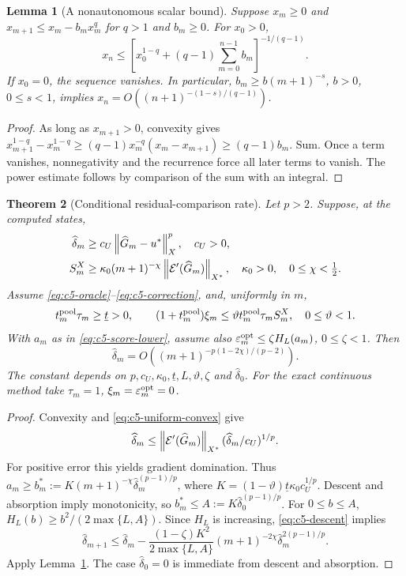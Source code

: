 \documentclass[11pt]{article}
\newtheorem{theorem}{Theorem}[section]
\newtheorem{lemma}[theorem]{Lemma}
\theoremstyle{remark}
\begin{document}
\begin{lemma}[A nonautonomous scalar bound]
\label{lem:c5-recurrence}
Suppose $x_m\geq0$ and
$x_{m+1}\leq x_m-b_mx_m^q$ for $q>1$ and $b_m\geq0$.
For $x_0>0$,
\begin{equation}
 x_n\leq\left[x_0^{1-q}+(q-1)\sum_{m=0}^{n-1}b_m\right]^{-1/(q-1)} .
 \label{eq:c5-recurrence}
\end{equation}
If $x_0=0$, the sequence vanishes. In particular,
$b_m\geq b(m+1)^{-s}$, $b>0$, $0\leq s<1$, implies
$x_n=O((n+1)^{-(1-s)/(q-1)})$.
\end{lemma}
\begin{proof}
As long as $x_{m+1}>0$, convexity gives
$x_{m+1}^{1-q}-x_m^{1-q}\geq
(q-1)x_m^{-q}(x_m-x_{m+1})\geq(q-1)b_m$.
Sum. Once a term vanishes, nonnegativity and the recurrence force all
later terms to vanish. The power estimate follows by comparison of the
sum with an integral.
\end{proof}

\begin{theorem}[Conditional residual-comparison rate]
\label{thm:c5-visible}
Let $p>2$. Suppose, at the computed states,
\begin{align}
 \widehat\delta_m&\geq c_U\left\lVert\widehat G_m-u^*\right\rVert_X^p,\quad c_U>0,
 \label{eq:c5-uniform-convex}\\
 S_m^X&\geq\kappa_0(m+1)^{-\chi}
                   \left\lVert\mathcal E'(\widehat G_m)\right\rVert_{X^*},
 \quad\kappa_0>0,\quad0\leq\chi<\tfrac12 .
 \label{eq:c5-visible}
\end{align}
Assume \eqref{eq:c5-oracle}--\eqref{eq:c5-correction}, and, uniformly in $m$,
\[
 t_m^{\rm pool}\tau_m\geq\underline t>0,\qquad
 (1+t_m^{\rm pool})\xi_m
 \leq\vartheta t_m^{\rm pool}\tau_m S_m^X,\quad0\leq\vartheta<1 .
\]
With $a_m$ as in \eqref{eq:c5-score-lower}, assume also
$\varepsilon_m^{\rm opt}\leq\zeta H_L(a_m)$, $0\leq\zeta<1$.
Then
\begin{equation}
 \widehat\delta_m=O((m+1)^{-p(1-2\chi)/(p-2)}) .
 \label{eq:c5-visible-rate}
\end{equation}
The constant depends on $p,c_U,\kappa_0,\underline t,L,\vartheta,\zeta$ and
$\widehat\delta_0$. For the exact continuous method take
$\tau_m=1$, $\xi_m=\varepsilon_m^{\rm opt}=0$.
\end{theorem}
\begin{proof}
Convexity and \eqref{eq:c5-uniform-convex} give
\[
 \widehat\delta_m\leq
 \left\lVert\mathcal E'(\widehat G_m)\right\rVert_{X^*}
       (\widehat\delta_m/c_U)^{1/p}.
\]
For positive error this yields gradient domination.
Thus $a_m\geq b_m^*:=K(m+1)^{-\chi}
\widehat\delta_m^{(p-1)/p}$, where
$K=(1-\vartheta)\underline t\kappa_0c_U^{1/p}$.
Descent and absorption imply monotonicity, so
$b_m^*\leq A:=K\widehat\delta_0^{(p-1)/p}$.
For $0\leq b\leq A$,
$H_L(b)\geq b^2/(2\max\{L,A\})$.
Since $H_L$ is increasing, \eqref{eq:c5-descent} implies
\[
 \widehat\delta_{m+1}\leq\widehat\delta_m-
 \frac{(1-\zeta)K^2}{2\max\{L,A\}}
 (m+1)^{-2\chi}\widehat\delta_m^{2(p-1)/p}.
\]
Apply Lemma~\ref{lem:c5-recurrence}. The case $\widehat\delta_0=0$
is immediate from descent and absorption.
\end{proof}
\end{document}
